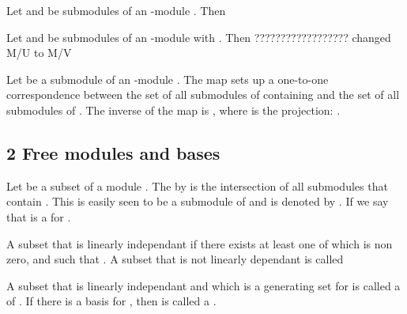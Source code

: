 \begin{Le}
\begin{A}
\begin{T} Let  and  be submodules of an -module . Then  \end{T}

\begin{T} Let  and  be submodules of an -module  with  . Then  ?????????????????? changed M/U to M/V \end{T}

\begin{T} Let  be a submodule of an -module . The map  sets up a one-to-one correspondence between the set of all submodules of  containing  and the set of all submodules of .
The inverse of the map is , where \e{$\pi$} is the projection: . \end{T}



\subsection{2 Free modules and bases}
\begin{D} Let  be a subset of a module . The  by  is the intersection of all submodules that contain . This is easily seen to be a submodule of  and is denoted by . If  we say that  is a  for . \end{D}

\begin{Le}  \end{Le}

\begin{D} A subset  that is linearly independant if there exists  at least one  of which is non zero, and  such that . A subset that is not linearly dependant is called  \end{D}

\begin{D} A subset  that is linearly independant and which is a generating set for  is called a  of . If there is a basis for , then  is called a . \end{D}


\end{A}
\end{Le}
